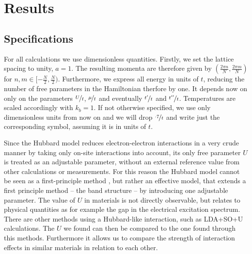 
 
\chapter{Results}

\section{Specifications} %

For all calculations we use dimensionless quantities. 
Firstly, we set the lattice spacing to unity, $a=1$. 
The resulting momenta are therefore given by $(\frac{2\pi n}{N},\frac{2\pi m}{N})$ for $n,m \in [-\frac N2, \frac N2)$.
Furthermore, we express all energy in units of $t$, reducing the number of free parameters in the Hamiltonian therfore by one.
It depends now on only on the parameters $\nicefrac Ut$, $\nicefrac {\mu}t$ and eventually $\nicefrac{t^{\prime}}t$ and $\nicefrac{t^{\prime \prime}}t$.
Temperatures are scaled accordingly with $k_b=1$.
If not otherwise specified, we use only dimensionless units from now on and we will drop $\nicefrac{\cdot7}{t}$ and write just the corresponding symbol, 
assuming it is in units of $t$.


Since the Hubbard model reduces electron-electron interactions in a very crude manner by taking only on-site interactions into account,
its only free parameter $U$ is treated as an adjustable parameter, without an external reference value from other calculations or measurements.	
For this reason the Hubbard model cannot be seen as a first-principle method \cite{J.Phys.Cond.Matter.Vol21.34},
but rather an effective model, that extends a first principle method – the band structure – by introducing one adjustable parameter.
The value of $U$ in materials is not directly observable, but relates to physical quantities as for example the gap in the electrical excitation spectrum.
There are other methods using a Hubbard-like interaction, such as LDA+SO+U calculations.
The $U$ we found can then be compared to the one found through this methods. 
Furthermore it allows us to compare the strength of interaction effects in similar materials in relation to each other.

